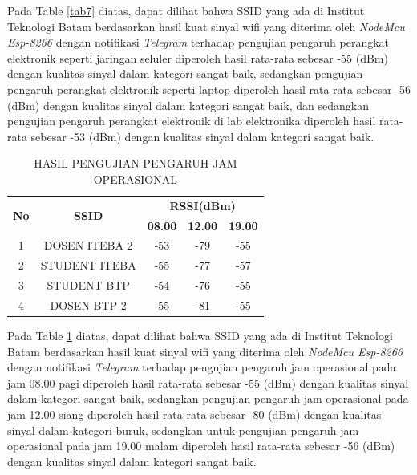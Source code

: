 \documentclass[conference]{IEEEtran}
\begin{document}
Pada Table \ref{tab7} diatas, dapat dilihat bahwa SSID yang ada di Institut Teknologi Batam berdasarkan hasil kuat sinyal wifi yang diterima oleh \textit{NodeMcu Esp-8266} dengan notifikasi \textit{Telegram} terhadap pengujian pengaruh perangkat elektronik seperti jaringan seluler diperoleh hasil rata-rata sebesar -55 (dBm) dengan kualitas sinyal dalam kategori sangat baik, sedangkan pengujian pengaruh perangkat elektronik seperti laptop diperoleh hasil rata-rata sebesar -56 (dBm) dengan kualitas sinyal dalam kategori sangat baik, dan sedangkan pengujian pengaruh perangkat elektronik di lab elektronika diperoleh hasil rata-rata sebesar -53 (dBm) dengan kualitas sinyal dalam kategori sangat baik.

\begin{table}[htbp]
        \caption{HASIL PENGUJIAN PENGARUH JAM OPERASIONAL}
        \label{tab8}
        \centering
        \begin{tabular}{|c|c|c|c|c|}
        \hline
        \multirow{2}{*}{\textbf{No}} & \multirow{2}{*}{\textbf{SSID}} & \multicolumn{3}{|c|}{\textbf{RSSI(dBm)}} \\
        \cline{3-5} 
         & & \textbf{08.00}& \textbf{12.00} & \textbf{19.00}\\
        \hline
        1 & DOSEN ITEBA 2 & -53 & -79 & -55 \\ \hline
        2 & STUDENT ITEBA & -55 & -77 & -57 \\ \hline
        3 & STUDENT BTP & -54 & -76 & -55 \\ \hline
         4 & DOSEN BTP 2 & -55 & -81 & -55 \\
       \hline
        \end{tabular}
\end{table}



Pada Table \ref{tab8} diatas, dapat dilihat bahwa SSID yang ada di Institut Teknologi Batam berdasarkan hasil kuat sinyal wifi yang diterima oleh \textit{NodeMcu Esp-8266} dengan notifikasi \textit{Telegram} terhadap pengujian pengaruh jam operasional pada jam 08.00 pagi diperoleh hasil rata-rata sebesar -55 (dBm) dengan kualitas sinyal dalam kategori sangat baik, sedangkan pengujian pengaruh jam operasional pada jam 12.00 siang diperoleh hasil rata-rata sebesar -80 (dBm) dengan kualitas sinyal dalam kategori buruk, sedangkan untuk pengujian pengaruh jam operasional pada jam 19.00 malam diperoleh hasil rata-rata sebesar -56 (dBm) dengan kualitas sinyal dalam kategori sangat baik.
\end{document}
